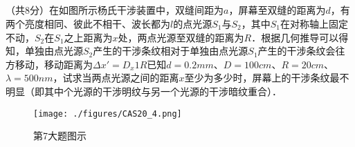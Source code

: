 \subsection{ }
（共8分）在如图所示杨氏干涉装置中，双缝间距为$a$，屏幕至双缝的距离为$d$，有两个亮度相同、彼此不相干、波长都为$l$的点光源$S_1$与$S_2$，其中$S_1$在对称轴上固定不动，$S_2$在$S_1$之上距离为$x$处，两点光源至双缝的距离为$R$．根据几何推导可以得知，单独由点光源$S_2$产生的干涉条纹相对于单独由点光源$S_1$产生的干涉条纹会往方移动，移动距离为$\Delta x'=D_{x}1R$已知$d=0.2mm$、$D=100cm$、$R=20cm$、$\lambda =500nm$，试求当两点光源之间的距离$x$至少为多少时，屏幕上的干涉条纹最不明显（即其中个光源的干涉明纹与另一个光源的干涉暗纹重合）．\\
\begin{figure}[ht]
\centering
\texttt{[image: ./figures/CAS20\_4.png]}
\caption{第7大题图示} \label{CAS20_fig4}
\end{figure}